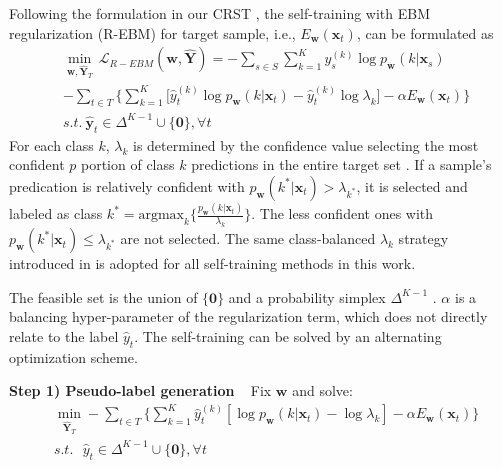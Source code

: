 \documentclass[a4paper,conference]{IEEEtran}
\theoremstyle{plain}%
\begin{document}
Following the formulation in our CRST \cite{zou2019confidence}, the self-training with EBM regularization (R-EBM) for target sample, i.e., $E_{\mathbf{w}}(\mathbf{x}_t)$, can be formulated as \begin{align}\label{cbst}
&\underset{\mathbf{w},{{{\hat{\mathbf{Y}}}}_{T}}}{\mathop{\min }}\,\mathcal{L}_{R-EBM}(\mathbf{w}, {\hat{\mathbf{Y}}}) = -\sum\limits_{{{s}}\in {{S}}}{\sum\limits_{k=1}^{K}{y_{s}^{(k)}}\log p_\mathbf{w}(k|{\mathbf{x}_{s}})} \nonumber \\
&-\sum\limits_{{{t}}\in {{T}}}\{{\sum\limits_{k=1}^{K}{[\hat{y}_{t}^{(k)}}\log p_\mathbf{w}(k|{\mathbf{x}_{t}})}-\hat{y}_{t}^{(k)}{{\log\lambda }_{k}}]-\alpha E_{\mathbf{w}}(\mathbf{x}_t)\}  \nonumber \\
&s.t.~{{{\hat{\mathbf{y}}}}_{t}}\in \Delta^{K-1}\cup \{\mathbf{0}\},\forall t 
\end{align} For each class $k$, $\lambda_{k}$ is determined by the confidence value selecting the most confident $p$ portion of class $k$ predictions in the entire target set \cite{Zou_2018_ECCV}. If a sample's predication is relatively confident with $p_\mathbf{w}(k^*|\mathbf{x}_t) > \lambda_{k^*}$, it is selected and labeled as class $k^* = \text{argmax}_{k}\{\frac {p_\mathbf{w}(k|{\mathbf{x}_{t}})}{\lambda_k}\}$. The less confident ones with $p_\mathbf{w}(k^*|\mathbf{x}_t) \leq \lambda_{k^*}$ are not selected. The same class-balanced $\lambda_{k}$ strategy introduced in \cite{Zou_2018_ECCV} is adopted for all self-training methods in this work. 

The feasible set is the union of $\{\mathbf{0}\}$ and a probability simplex $\Delta^{K-1}$  \cite{Zou_2018_ECCV}. $\alpha$ is a balancing hyper-parameter of the regularization term, which does not directly relate to the label $\hat{y}_{t}$. The self-training can be solved by an alternating optimization scheme.\vspace{+5pt}

\noindent \textbf{Step 1) Pseudo-label generation} \label{_a)} ~ Fix $\mathbf{w}$ and solve: \begin{align}\label{cbst_a}
& \underset{{{{\hat{\mathbf{Y}}}}_{T}}}{\mathop{\min }}  -\sum\limits_{{{t}}\in {{T}}}\{{\sum\limits_{k=1}^{K}{\hat{y}_{t}^{(k)}}[\log {p_\mathbf{w}(k|{\mathbf{x}_{t}})}-\log{{{\lambda }_{k}}}]}-\alpha E_{\mathbf{w}}(\mathbf{x}_t) \} \nonumber\\
& s.t.\text{ }{{{\hat{y}}}_{t}}\in\Delta^{K-1}\cup \{\mathbf{0}\},\forall t \end{align} 
\end{document}
